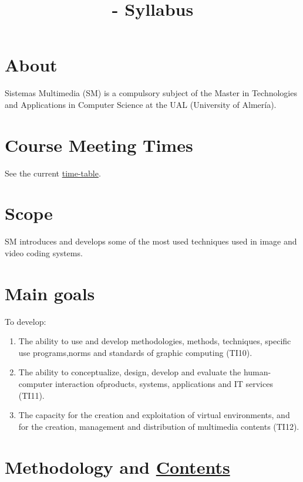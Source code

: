 

\title{\SM{} - Syllabus}

\maketitle

\section{About}

Sistemas Multimedia (SM) is a compulsory subject of the Master in
Technologies and Applications in Computer Science at the UAL
(University of Almería).

\section{Course Meeting Times}

See the current \href{https://www.ual.es/estudios/masteres/presentacion/plandeestudios/asignatura/7114/71142105}{time-table}.

\section{Scope}

SM introduces and develops some of the most used techniques used in
image and video coding systems.

\section{Main goals}

To develop:
\begin{enumerate}
\item The ability to use and develop methodologies, methods,
  techniques, specific use programs,norms and standards of graphic
  computing (TI10).
\item The ability to conceptualize, design, develop and evaluate the
  human-computer interaction ofproducts, systems, applications and IT
  services (TI11).
\item The capacity for the creation and exploitation of virtual
  environments, and for the creation, management and distribution of
  multimedia contents (TI12).
\end{enumerate}

\section{Methodology and \href{https://sistemas-multimedia.github.io/contents/}{Contents}}

